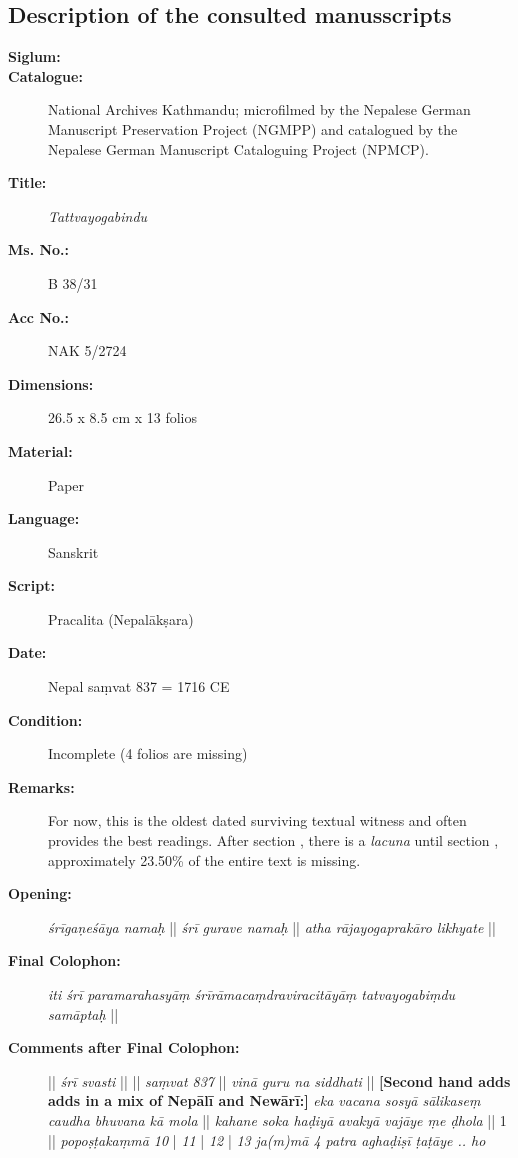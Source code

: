 \subsection{Description of the consulted manusscripts}
\vspace{0.25cm}
\begin{description}
\item[\textbf{Siglum:}] \Huge{} \nocite{ytbn1}
\item[\textbf{Catalogue:}] National Archives Kathmandu; microfilmed by the Nepalese German Manuscript Preservation Project (NGMPP) and catalogued by the Nepalese German Manuscript Cataloguing Project (NPMCP). 
\item[\textbf{Title:}] \emph{Tattvayogabindu} 
\item[\textbf{Ms. No.:}] B 38/31
\item[\textbf{Acc No.:}] NAK 5/2724
\item[\textbf{Dimensions:}] 26.5 x 8.5 cm x 13 folios 
\item[\textbf{Material:}] Paper
\item[\textbf{Language:}] Sanskrit
\item[\textbf{Script:}] Pracalita (Nepalākṣara)
\item[\textbf{Date:}] Nepal saṃvat 837 = 1716 CE
\item[\textbf{Condition:}] Incomplete (4 folios are missing)
\item[\textbf{Remarks:}] For now, this is the oldest dated surviving textual witness and often provides the best readings. After section , there is a \textit{lacuna} until section , approximately 23.50\% of the entire text is missing. 
\item[\textbf{Opening:}] \textit{śrīgaṇeśāya namaḥ} || \textit{śrī gurave namaḥ} || \textit{atha rājayogaprakāro  likhyate} ||
\item[\textbf{Final Colophon:}] \textit{iti śrī paramarahasyāṃ śrīrāmacaṃdraviracitāyāṃ tatvayogabiṃdu samāptaḥ} ||
\item[\textbf{Comments after Final Colophon:}] || \textit{śrī svasti} || || \textit{saṃvat 837} || \textit{vinā guru na siddhati} || \textbf{[Second hand adds adds in a mix of Nepālī and Newārī:]} \textit{eka vacana sosyā sālikaseṃ caudha bhuvana kā mola} || \textit{kahane soka haḍiyā avakyā vajāye ṃe ḍhola} || 1 || \textit{popoṣṭakaṃmā 10} | \textit{11} | \textit{12} | \textit{13} \textit{ja(m)mā 4 patra aghaḍiṣī ṭaṭāye .. ho} 
\end{description}
\newpage
